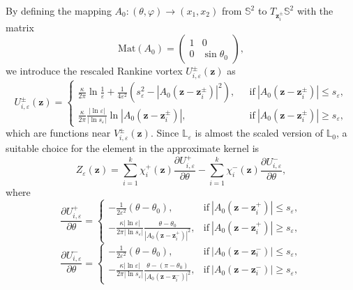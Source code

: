 \documentclass[12pt,reqno]{amsart}
\numberwithin{equation}{section}
\theoremstyle{definition}
\theoremstyle{remark}
\begin{document}
By defining the mapping $A_0: (\theta,\varphi)\to (x_1,x_2)$ from $\mathbb S^2$ to $T_{\boldsymbol z_i^\pm}\mathbb S^2$ with the matrix 
\begin{equation*}
	\mathrm{Mat}(A_0)=\left(
	\begin{array}{ccc}
		1 & 0             \\
		0 & \sin\theta_0
	\end{array}
	\right),
\end{equation*}
we introduce the rescaled Rankine vortex $U^\pm_{i,\varepsilon}(\boldsymbol z)$ as 
\begin{equation*}
	U^\pm_{i,\varepsilon}(\boldsymbol z)=\left\{
	\begin{array}{lll}
		\frac{\kappa}{2\pi}\ln\frac{1}{\varepsilon}+\frac{1}{4\varepsilon^2}(s_\varepsilon^2-|A_0(\boldsymbol z-\boldsymbol z^\pm_i)|^2), \ \ \ &\mathrm{if} \ |A_0(\boldsymbol z-\boldsymbol z^\pm_i)|\le s_\varepsilon,\\
		\frac{\kappa}{2\pi}\frac{|\ln\varepsilon|}{|\ln s_\varepsilon|}\ln|A_0(\boldsymbol z-\boldsymbol z^\pm_i)|,&\mathrm{if} \ |A_0(\boldsymbol z-\boldsymbol z^\pm_i)|\ge s_\varepsilon,
	\end{array}
	\right.
\end{equation*}
which are functions near $V^\pm_{i,\varepsilon}(\boldsymbol z)$. Since $\mathbb L_\varepsilon$ is almost the scaled version of $\mathbb L_0$, a suitable choice for the element in the approximate kernel is
\begin{equation*}
	Z_\varepsilon ({\boldsymbol z})=\sum\limits_{i=1}^k\chi_i^+ ({\boldsymbol z})\frac{\partial U^+_{i,\varepsilon}}{\partial \theta}-\sum\limits_{i=1}^k\chi_i^- ({\boldsymbol z})\frac{\partial U^-_{i,\varepsilon}}{\partial \theta},
\end{equation*}
where
\begin{equation*}
	\frac{\partial U^+_{i,\varepsilon}}{\partial \theta}=\left\{
	\begin{array}{lll}
		-\frac{1}{2\varepsilon^2}(\theta-\theta_0), \ \ \ & \mathrm{if} \ |A_0(\boldsymbol z-\boldsymbol z^+_i)|\le s_\varepsilon,\\
		-\frac{\kappa|\ln \varepsilon|}{2\pi|\ln s_\varepsilon|}\frac{\theta-\theta_0}{|A_0(\boldsymbol z-\boldsymbol z^+_i)|^2}, & \mathrm{if} \ |A_0(\boldsymbol z-\boldsymbol z^+_i)|\ge s_\varepsilon,
	\end{array}
	\right.
\end{equation*}
\begin{equation*}
	\frac{\partial U^-_{i,\varepsilon}}{\partial \theta}=\left\{
	\begin{array}{lll}
		-\frac{1}{2\varepsilon^2}(\theta-\theta_0), \ \ \ & \mathrm{if} \ |A_0(\boldsymbol z-\boldsymbol z^-_i)|\le s_\varepsilon,\\
		-\frac{\kappa|\ln \varepsilon|}{2\pi|\ln s_\varepsilon|}\frac{\theta-(\pi-\theta_0)}{|A_0(\boldsymbol z-\boldsymbol z^-_i)|^2}, & \mathrm{if} \ |A_0(\boldsymbol z-\boldsymbol z^-_i)|\ge s_\varepsilon,
	\end{array}
	\right.
\end{equation*}
\end{document}
